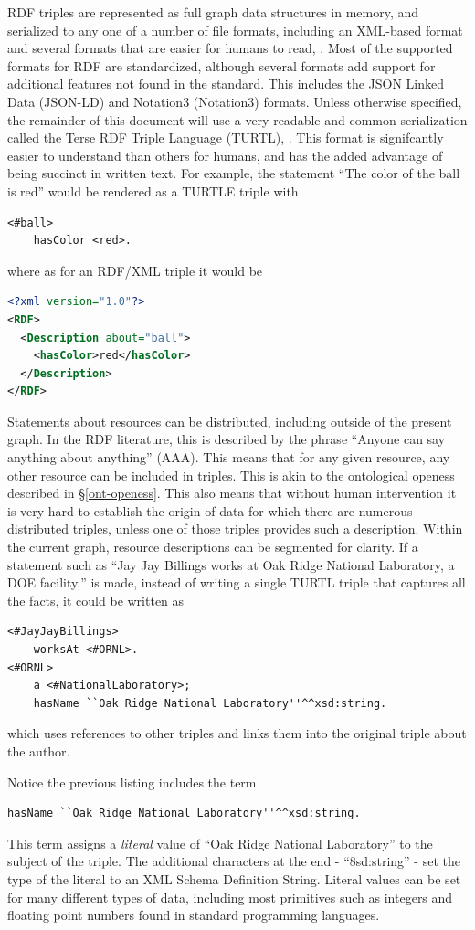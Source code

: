 RDF triples are represented as full graph data structures in memory, and
serialized to any one of a number of file formats, including an XML-based format
and several formats that are easier for humans to read, \cite{rdf-wikipedia}.
Most of the supported formats for RDF are standardized, although several formats
add support for additional features not found in the standard. This includes the
JSON Linked Data (JSON-LD) and Notation3 (Notation3) formats. Unless otherwise
specified, the remainder of this document will use a very readable and common
serialization called the Terse RDF Triple Language (TURTL), \cite{turtl}. This
format is signifcantly easier to understand than others for humans, and has the
added advantage of being succinct in written text. For example, the statement
``The color of the ball is red'' would be rendered as a TURTLE triple with
\begin{lstlisting}[language=TURTL]
<#ball>
    hasColor <red>.
\end{lstlisting}
where as for an RDF/XML triple it would be
\begin{lstlisting}[language=XML]
<?xml version="1.0"?>
<RDF>
  <Description about="ball">
    <hasColor>red</hasColor>
  </Description>
</RDF>
\end{lstlisting}

Statements about resources can be distributed, including outside of the
present graph. In the RDF literature, this is described by the
phrase ``Anyone can say anything about anything'' (AAA). This means that for any
given resource, any other resource can be included in triples. This is akin to
the ontological openess described in \S \ref{ont-openess}. This also means that
without human intervention it is very hard to establish the origin of data
for which there are numerous distributed triples, unless one of those
triples provides such a description. Within the current graph, resource
descriptions can be segmented for clarity. If a statement such as ``Jay Jay
Billings works at Oak Ridge National Laboratory, a DOE facility,'' is made,
instead of writing a single TURTL triple that captures all the facts, it
could be written as
\begin{lstlisting}[language=TURTL]
<#JayJayBillings>
    worksAt <#ORNL>.
<#ORNL>
    a <#NationalLaboratory>;
    hasName ``Oak Ridge National Laboratory''^^xsd:string.    
\end{lstlisting}
which uses references to other triples and links them into the original
triple about the author.

Notice the previous listing includes the term
\begin{lstlisting}[language=TURTL]
    hasName ``Oak Ridge National Laboratory''^^xsd:string.
\end{lstlisting}
This term assigns a \textit{literal} value of ``Oak Ridge National Laboratory''
to the subject of the triple. The additional characters at the end -
``^^xsd:string'' - set the type of the literal to an XML Schema Definition
String. Literal values can be set for many different types of data, including
most primitives such as integers and floating point numbers found in standard
programming languages.


